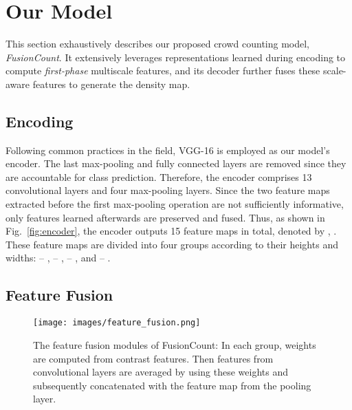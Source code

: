 \documentclass{article}
\begin{document}
\section{Our Model}
\label{sec:method}

This section exhaustively describes our proposed crowd counting model, \emph{FusionCount}. It extensively leverages representations learned during encoding to compute \emph{first-phase} multiscale features, and its decoder further fuses these scale-aware features to generate the density map.

\subsection{Encoding}
\label{subsec:encoding}

Following common practices \cite{CSRNet, CAN} in the field, VGG-16 \cite{VGG} is employed as our model's encoder. The last max-pooling and fully connected layers are removed since they are accountable for class prediction. Therefore, the encoder comprises 13 convolutional layers and four max-pooling layers. Since the two feature maps extracted before the first max-pooling operation are not sufficiently informative, only features learned afterwards are preserved and fused. Thus, as shown in Fig.~\ref{fig:encoder}, the encoder outputs 15 feature maps in total, denoted by , . These feature maps are divided into four groups according to their heights and widths:  -- ,  -- ,  -- , and  -- .

































 
\subsection{Feature Fusion}
\label{ssec:feature_fusion}

\begin{figure}[t]
    \centering
    \texttt{[image: images/feature\_fusion.png]}
    \caption{The feature fusion modules of FusionCount: In each group, weights are computed from contrast features. Then features from convolutional layers are averaged by using these weights and subsequently concatenated with the feature map from the pooling layer.}
    \label{fig:feature_fusion}
\end{figure}
\end{document}
